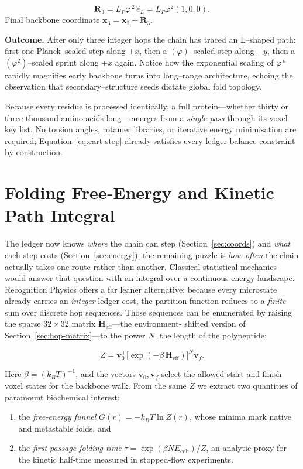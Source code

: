 \documentclass[11pt]{article}
\newcommand{\phiGR}{\varphi}                 %
\newcommand{\LP}{L_{\!P}}                    %
\newcommand{\Eoh}{E_{\mathrm{coh}}}          %
\begin{document}
\[
\mathbf R_{3}
=
\LP\phiGR^{\,2}\,\hat e_{L}
=
\LP\phiGR^{2}(1,0,0).
\]
Final backbone coordinate
$\mathbf x_{3}=\mathbf x_{2}+\mathbf R_{3}$.

\medskip
\noindent
\textbf{Outcome.}  
After only three integer hops the chain has traced an L–shaped path:
first one Planck–scaled step along $+x$, then a $(\phiGR)$–scaled step
along $+y$, then a $(\phiGR^{2})$–scaled sprint along $+x$ again.
Notice how the exponential scaling of $\phiGR^{\,n}$ rapidly magnifies
early backbone turns into long–range architecture, echoing the
observation that secondary–structure seeds dictate global fold topology.

Because every residue is processed identically, a full protein—whether
thirty or three thousand amino acids long—emerges from a \emph{single
pass} through its voxel key list.  No torsion angles, rotamer libraries,
or iterative energy minimisation are required; Equation~\eqref{eq:cart-step}
already satisfies every ledger balance constraint by construction.

\section{Folding Free‐Energy and Kinetic Path Integral}\label{sec:kinetics}

The ledger now knows \emph{where} the chain can step
(Section~\ref{sec:coords}) and \emph{what} each step costs
(Section~\ref{sec:energy}); the remaining puzzle is \emph{how often} the
chain actually takes one route rather than another.  Classical
statistical mechanics would answer that question with an integral over a
continuous energy landscape.  Recognition Physics offers a far leaner
alternative: because every microstate already carries an \emph{integer}
ledger cost, the partition function reduces to a \emph{finite} sum over
discrete hop sequences.  Those sequences can be enumerated by raising
the sparse $32\times32$ matrix $\mathbf H_{\text{eff}}$—the environment‐
shifted version of Section~\ref{sec:hop-matrix}—to the power $N$, the
length of the polypeptide:

\[
Z
=
\mathbf v_{0}^{\!\top}\!
\bigl[\exp(-\beta\,\mathbf H_{\text{eff}})\bigr]^{N}
\mathbf v_{f}.
\]

Here $\beta=(k_{B}T)^{-1}$, and the vectors $\mathbf v_{0},\mathbf v_{f}$
select the allowed start and finish voxel states for the backbone walk.
From the same $Z$ we extract two quantities of paramount biochemical
interest:

\begin{enumerate}
\item the \emph{free‐energy funnel} $G(r)=-k_{B}T\ln Z(r)$, whose minima
      mark native and metastable folds, and
\item the \emph{first‐passage folding time}
      $\tau=\exp(\beta N\Eoh)/Z$, an analytic proxy for the kinetic half‐time
      measured in stopped‐flow experiments.
\end{enumerate}
\end{document}
